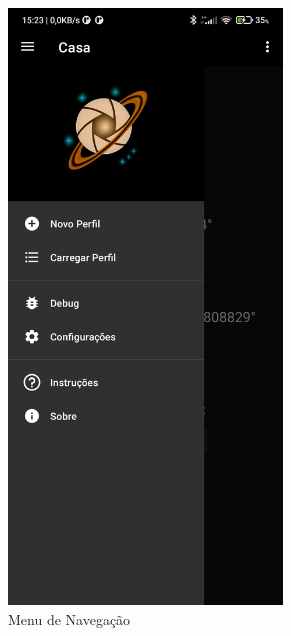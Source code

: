 \begin{figure}[!htb]
	\centering
	\caption{Menus}
	\label{overflowmenus}
	
	\begin{subfigure}[b]{0.3\textwidth}
		\centering
		\includegraphics[width=0.8\textwidth]{figuras/desAplicativo/menu}
		\caption{Menu de Navegação}
		\label{menu}
	\end{subfigure}
	\hfill
	\begin{subfigure}[b]{0.3\textwidth}
		\centering

\end{subfigure}
\end{figure}
